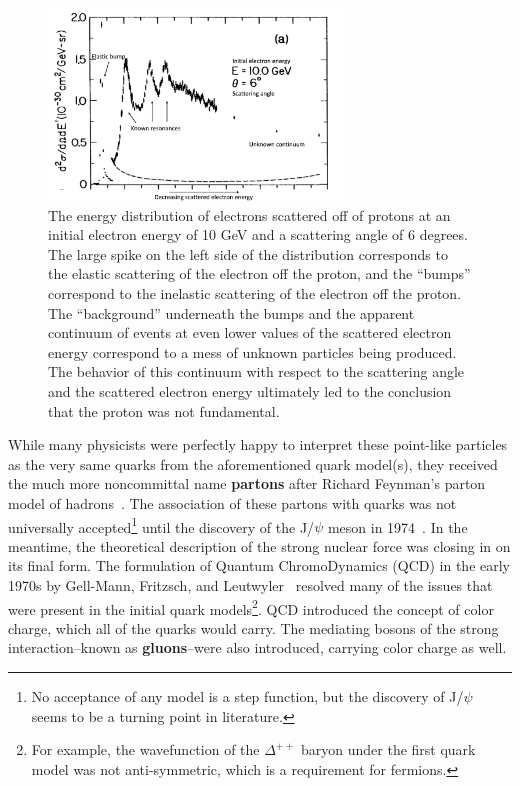 \begin{figure}[ht]
    \centering
    \includegraphics[width=0.7\textwidth]{figures/introduction/DeepInelasticScattering.png}
    \caption{The energy distribution of electrons scattered off of protons at an initial electron energy of 10 GeV and a scattering angle of 6 degrees. The large spike on the left side of the distribution corresponds to the elastic scattering of the electron off the proton, and the ``bumps'' correspond to the inelastic scattering of the electron off the proton. The ``background'' underneath the bumps and the apparent continuum of events at even lower values of the scattered electron energy correspond to a mess of unknown particles being produced. The behavior of this continuum with respect to the scattering angle and the scattered electron energy ultimately led to the conclusion that the proton was not fundamental.}
    \label{fig:dis}
\end{figure}

While many physicists were perfectly happy to interpret these point-like particles as the very same quarks from the aforementioned quark model(s), they received the much more noncommittal name \textbf{partons} after Richard Feynman's parton model of hadrons~\cite{Partons}. The association of these partons with quarks was not universally accepted\footnote{No acceptance of any model is a step function, but the discovery of J/$\psi$ seems to be a turning point in literature.} until the discovery of the J/$\psi$ meson in 1974~\cite{Jpsi}. In the meantime, the theoretical description of the strong nuclear force was closing in on its final form. The formulation of Quantum ChromoDynamics (QCD) in the early 1970s by Gell-Mann, Fritzsch, and Leutwyler~\cite{QCDFormulation} resolved many of the issues that were present in the initial quark models\footnote{For example, the wavefunction of the $\Delta^{++}$ baryon under the first quark model was not anti-symmetric, which is a requirement for fermions.}. QCD introduced the concept of color charge, which all of the quarks would carry. The mediating bosons of the strong interaction--known as \textbf{gluons}--were also introduced, carrying color charge as well.

